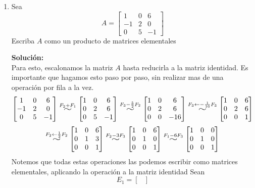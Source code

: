 \documentclass[12pt]{article}
\newenvironment{solucion}
{\begin{mdframed}[backgroundcolor=black!10]
		{\bf Solución:}\\
	}
	{
	\end{mdframed}
}
\newenvironment{preguntas}
{\begin{enumerate}\itemsep12pt
	}
	{
	\end{enumerate}
}
\newcommand{\widesim}[2][1.5]{
	\mathrel{\overset{#2}{\scalebox{#1}[1]{$\sim$}}}
}
\begin{document}
\begin{preguntas}
\item Sea
	$$A = \begin{bmatrix}
	1 & 0 & 6\\
	-1 & 2 & 0\\
	0 & 5 & -1
	\end{bmatrix}$$
	Escriba $A$ como un producto de matrices elementales
\begin{solucion}
Para esto, escalonamos la matriz $A$ hasta reducirla a la matriz identidad. Es importante que hagamos esto paso por paso, sin realizar mas de una operación por fila a la vez.
		$$\begin{bmatrix}
		1 & 0 & 6\\
		-1 & 2 & 0\\
		0 & 5 & -1
		\end{bmatrix} \widesim{F_2+F_1}
		\begin{bmatrix}
		1 & 0 & 6\\
		0 & 2 & 6\\
		0 & 5 & -1
		\end{bmatrix} \widesim{F_3-\frac{5}{2}F_2}
		\begin{bmatrix}
		1 & 0 & 6\\
		0 & 2 & 6\\
		0 & 0 & -16
		\end{bmatrix} \widesim{F_3 \leftarrow -\frac{1}{16}F_3}
		\begin{bmatrix}
		1 & 0 & 6\\
		0 & 2 & 6\\
		0 & 0 & 1
		\end{bmatrix}$$
		$$\widesim{F_2 \leftarrow \frac{1}{2}F_2}
		\begin{bmatrix}
		1 & 0 & 6\\
		0 & 1 & 3\\
		0 & 0 & 1
		\end{bmatrix} \widesim{F_2 - 3F_3}
		\begin{bmatrix}
		1 & 0 & 6\\
		0 & 1 & 0\\
		0 & 0 & 1
		\end{bmatrix} \widesim{F_1 - 6F_3}
		\begin{bmatrix}
		1 & 0 & 0\\
		0 & 1 & 0\\
		0 & 0 & 1
		\end{bmatrix}$$
		Notemos que todas estas operaciones las podemos escribir como matrices elementales, aplicando la operación a la matriz identidad Sean
		$$E_1 = \begin{bmatrix}

\end{bmatrix}$$
\end{solucion}
\end{preguntas}
\end{document}

